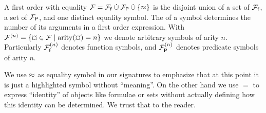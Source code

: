 
\begin{definition}\label{def:signature}
A
first order
 with equality
\( \mathcal{F} = {\mathcal{F}_{\mathsf{f}}} \mathbin{\dot\cup} {\mathcal{F}_{\mathsf{P}}} \mathbin{\dot\cup} \{\approx \} \)
is the disjoint union of
a set of  \( {\mathcal{F}_{\mathsf{f}}} \),
a set of  \( {\mathcal{F}_{\mathsf{P}}} \),
and one distinct equality symbol.
%
The  of a symbol determines the number of its arguments in a first order expression. 
With \( \mcFn = \{ \Pf\in\mcF \mid \arity(\Pf) = n \} \) 
we denote arbitrary symbols of arity \(n\). 
Particularly \( {\mathcal{F}^{(n)}_{\mathsf{f}}} \) denotes function symbols, 
and \( {\mathcal{F}^{(n)}_{\mathsf{P}}} \) denotes predicate symbols of arity \( n \).

\end{definition}

\begin{remark}
    We use \( \approx \) as equality symbol in our signatures to emphasize
    that at this point it is just a highlighted symbol
    without “meaning”.
    On the other hand we use \( = \) to express “identity” of objects
    like formulae or sets
    without actually defining how this identity can be determined.
    We trust that to the reader.
\end{remark}
